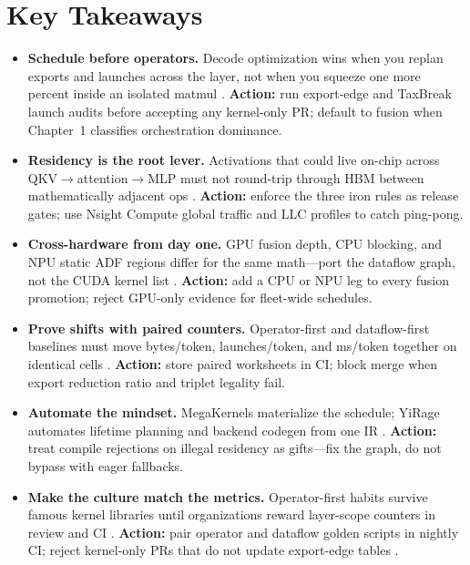 \section{Key Takeaways}
\label{sec:ch02_key_takeaways}

\begin{itemize}
\item \textbf{Schedule before operators.}
Decode optimization wins when you replan exports and launches across the layer, not when you squeeze one more percent inside an isolated matmul \citep{taxbreak2026,memoryfloor2026}.
\textbf{Action:} run export-edge and TaxBreak launch audits before accepting any kernel-only PR; default to fusion when Chapter~1 classifies orchestration dominance.

\item \textbf{Residency is the root lever.}
Activations that could live on-chip across QKV$\rightarrow$attention$\rightarrow$MLP must not round-trip through HBM between mathematically adjacent ops \citep{memoryfloor2026,dao2022flashattention}.
\textbf{Action:} enforce the three iron rules as release gates; use Nsight Compute global traffic and LLC profiles to catch ping-pong.

\item \textbf{Cross-hardware from day one.}
GPU fusion depth, CPU blocking, and NPU static ADF regions differ for the same math---port the dataflow graph, not the CUDA kernel list \citep{amd2024xdna,yirage2026}.
\textbf{Action:} add a CPU or NPU leg to every fusion promotion; reject GPU-only evidence for fleet-wide schedules.

\item \textbf{Prove shifts with paired counters.}
Operator-first and dataflow-first baselines must move bytes/token, launches/token, and ms/token together on identical cells \citep{patel2025llminference,taxbreak2026}.
\textbf{Action:} store paired worksheets in CI; block merge when export reduction ratio and triplet legality fail.

\item \textbf{Automate the mindset.}
MegaKernels materialize the schedule; YiRage automates lifetime planning and backend codegen from one IR \citep{yirage2026,chen2020compilerbasedhardw}.
\textbf{Action:} treat compile rejections on illegal residency as gifts---fix the graph, do not bypass with eager fallbacks.

\item \textbf{Make the culture match the metrics.}
Operator-first habits survive famous kernel libraries until organizations reward layer-scope counters in review and CI \citep{taxbreak2026,patel2025llminference,kwon2023vllm}.
\textbf{Action:} pair operator and dataflow golden scripts in nightly CI; reject kernel-only PRs that do not update export-edge tables \citep{memoryfloor2026,yirage2026}.
\end{itemize}

